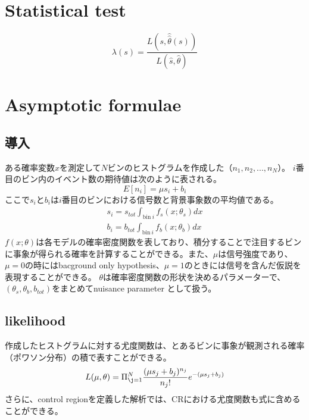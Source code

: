 \section{Statistical test}

\begin{equation}
  \lambda(s) = \frac{L(s,\hat{\hat{\theta}}(s))}{L(\hat{s},\hat{\theta})}
\end{equation}


\section{Asymptotic formulae}
\subsection{導入}
ある確率変数$x$を測定して$N$ビンのヒストグラムを作成した（$n_1,n_2,...,n_N$）。
$i$番目のビン内のイベント数の期待値は次のように表される。
\begin{equation}
E[n_i] = \mu s_i + b_i
\end{equation}
ここで$s_i$と$b_i$は$i$番目のビンにおける信号数と背景事象数の平均値である。
\begin{eqnarray}
 s_i = s_{tot}\int_{\mathrm{bin}~i}f_s(x;\theta_s)dx \\
 b_i = b_{tot}\int_{\mathrm{bin}~i}f_b(x;\theta_b)dx
\end{eqnarray}
$f(x;\theta)$は各モデルの確率密度関数を表しており、積分することで注目するビンに事象が得られる確率を計算することができる。また、$\mu$は信号強度であり、$\mu=0$の時にはbacground only hypothesis、$\mu=1$のときには信号を含んだ仮説を表現することができる。
$\theta$は確率密度関数の形状を決めるパラメーターで、$(\theta_s,\theta_b,b_{tot})$をまとめてnuisance parameter として扱う。

\subsection{likelihood}
作成したヒストグラムに対する尤度関数は、とあるビンに事象が観測される確率（ポワソン分布）の積で表すことができる。
\begin{equation}
    L(\mu, \theta) = \Pi_{\j=1}^{N} \frac{(\mu s_j + b_j)^{n_j}}{n_j!}e^{-(\mu s_j + b_j)}
\end{equation}
さらに、control regionを定義した解析では、CRにおける尤度関数も式に含めることができる。

